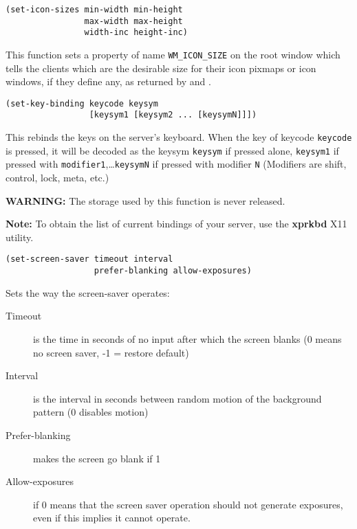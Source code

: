         
{\usagefont\begin{verbatim}
(set-icon-sizes min-width min-height
                max-width max-height
                width-inc height-inc)
\end{verbatim}}\usageupspace

This function sets a property of name \verb"WM_ICON_SIZE" on the root window
which tells the clients which are the desirable size for their icon pixmaps
or icon windows, if they define any, as returned by 
 and .

        
{\usagefont\begin{verbatim}
(set-key-binding keycode keysym 
                 [keysym1 [keysym2 ... [keysymN]]])
\end{verbatim}}\usageupspace

This rebinds the keys on the server's keyboard. When the key of keycode
\verb"keycode" is pressed, it will be decoded as the keysym
\verb"keysym" if pressed alone, \verb"keysym1" if pressed with
\verb"modifier1",\ldots  \verb"keysymN" if pressed with modifier {\tt N}
(Modifiers are shift, control, lock, meta, etc.)

{\bf WARNING:} The storage used by this function is never released.

{\bf Note:} To obtain the list of current bindings of your server, use the
{\bf xprkbd} X11 utility.

        
{\usagefont\begin{verbatim}
(set-screen-saver timeout interval 
                  prefer-blanking allow-exposures)
\end{verbatim}}\usageupspace

Sets the way the screen-saver operates:

\begin{description}

\item[Timeout] is the time in seconds of no input after which the screen blanks
                (0 means no screen saver, -1 = restore default)
\item[Interval] is the interval in seconds between random motion of the background
                pattern (0 disables motion)
\item[Prefer-blanking] makes the screen go blank if 1
\item[Allow-exposures] if 0 means that the screen saver operation should not
                generate exposures, even if this implies it cannot operate.
\end{description}


